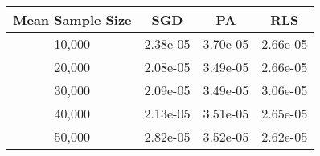 \begin{tabular}{cccc}
\toprule
Mean Sample Size &       SGD &        PA &       RLS \\
\midrule
          10,000 &  2.38e-05 &  3.70e-05 &  2.66e-05 \\
          20,000 &  2.08e-05 &  3.49e-05 &  2.66e-05 \\
          30,000 &  2.09e-05 &  3.49e-05 &  3.06e-05 \\
          40,000 &  2.13e-05 &  3.51e-05 &  2.65e-05 \\
          50,000 &  2.82e-05 &  3.52e-05 &  2.62e-05 \\
\bottomrule
\end{tabular}
